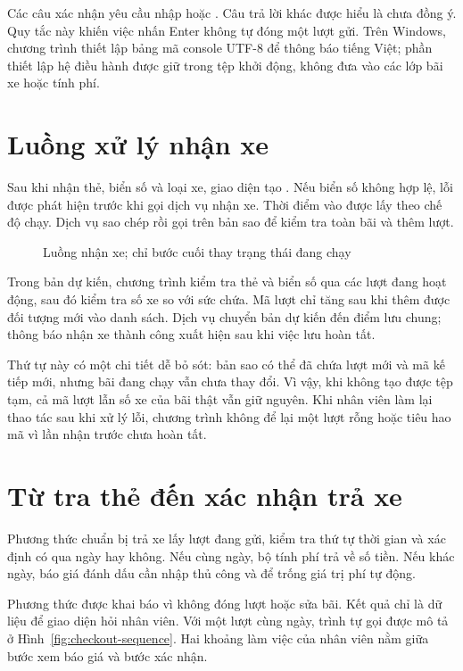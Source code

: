 Các câu xác nhận yêu cầu nhập  hoặc . Câu trả lời khác được hiểu là chưa đồng ý. Quy tắc này khiến việc nhấn Enter không tự đóng một lượt gửi. Trên Windows, chương trình thiết lập bảng mã console UTF-8 để thông báo tiếng Việt; phần thiết lập hệ điều hành được giữ trong tệp khởi động, không đưa vào các lớp bãi xe hoặc tính phí.

\section{Luồng xử lý nhận xe}
Sau khi nhận thẻ, biển số và loại xe, giao diện tạo . Nếu biển số không hợp lệ, lỗi được phát hiện trước khi gọi dịch vụ nhận xe. Thời điểm vào được lấy theo chế độ chạy. Dịch vụ sao chép  rồi gọi  trên bản sao để kiểm tra toàn bãi và thêm lượt.

\begin{figure}[H]
\centering

\caption{Luồng nhận xe; chỉ bước cuối thay trạng thái đang chạy}
\label{fig:checkin}
\end{figure}

Trong bản dự kiến, chương trình kiểm tra thẻ và biển số qua các lượt đang hoạt động, sau đó kiểm tra số xe so với sức chứa. Mã lượt chỉ tăng sau khi thêm được đối tượng mới vào danh sách. Dịch vụ chuyển bản dự kiến đến điểm lưu chung; thông báo nhận xe thành công xuất hiện sau khi việc lưu hoàn tất.

Thứ tự này có một chi tiết dễ bỏ sót: bản sao có thể đã chứa lượt mới và mã kế tiếp mới, nhưng bãi đang chạy vẫn chưa thay đổi. Vì vậy, khi không tạo được tệp tạm, cả mã lượt lẫn số xe của bãi thật vẫn giữ nguyên. Khi nhân viên làm lại thao tác sau khi xử lý lỗi, chương trình không để lại một lượt rỗng hoặc tiêu hao mã vì lần nhận trước chưa hoàn tất.

\section{Từ tra thẻ đến xác nhận trả xe}
Phương thức chuẩn bị trả xe lấy lượt đang gửi, kiểm tra thứ tự thời gian và xác định có qua ngày hay không. Nếu cùng ngày, bộ tính phí trả về số tiền. Nếu khác ngày, báo giá đánh dấu cần nhập thủ công và để trống giá trị phí tự động.


Phương thức được khai báo  vì không đóng lượt hoặc sửa bãi. Kết quả chỉ là dữ liệu để giao diện hỏi nhân viên. Với một lượt cùng ngày, trình tự gọi được mô tả ở Hình~\ref{fig:checkout-sequence}. Hai khoảng làm việc của nhân viên nằm giữa bước xem báo giá và bước xác nhận.

